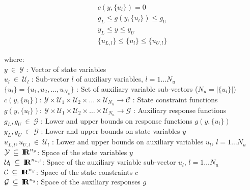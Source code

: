{\bsinglespace
\begin{eqnarray}
& c(y,\{u_l\})  = 0 & \label{tsfcorenonlin:equ:c} \\
& g_L \leq g(y,\{u_l\}) \leq g_U \label{tsfcorenonlin:equ:g} \\
& y_L \leq y \leq y_U \label{tsfcorenonlin:equ:y_bnds} \\
& \{u_{L,l}\} \leq \{u_l\} \leq \{u_{U,l}\} \label{tsfcorenonlin:equ:u_bnds}
\end{eqnarray}
\begin{tabbing}
\hspace{4ex}where:\hspace{5ex}\= \\
\>	$y \:\in\:\mathcal{Y}$ : Vector of state variables \\
\>	$u_l \:\in\:\mathcal{U}_l$ : Sub-vector $l$ of auxiliary variables, $l = 1 \ldots N_u$ \\
\>	$\{u_l\} = \{u_1,u_2,\ldots,u_{N_u}\}$ : Set of auxiliary variable sub-vectors ($N_u = |\{u_l\}|$) \\
\>	$c(y,\{u_l\}) : \:\mathcal{Y} \times \mathcal{U}_1 \times \mathcal{U}_2 \times \ldots \times \mathcal{U}_{N_u}
                 \rightarrow \mathcal{C}$ : State constraint functions \\
\>	$g(y,\{u_l\}) : \:\mathcal{Y} \times \mathcal{U}_1 \times \mathcal{U}_2 \times \ldots \times \mathcal{U}_{N_u}
                 \rightarrow \mathcal{G}$ : Auxiliary response functions \\
\>	$g_L, g_U \:\in\:\mathcal{G}$ : Lower and upper bounds on response functions $g(y,\{u_l\})$ \\
\>	$y_L, y_U \:\in\:\mathcal{G}$ : Lower and upper bounds on state variables $y$ \\
\>	$u_{L,l}, u_{U,l} \:\in\:\mathcal{U}_l$ : Lower and upper bounds on auxiliary variables $u_l$, $l = 1 \ldots N_u$ \\
\>	$\mathcal{Y} \:\subseteq\:\mbox{\textbf{I}}\hspace{-0.6ex}\mbox{\textbf{R}}^{n_y}$: Space of the state variables $y$ \\
\>	$\mathcal{U}_l \:\subseteq\:\mbox{\textbf{I}}\hspace{-0.6ex}\mbox{\textbf{R}}^{n_{u,l}}$: Space of the auxiliary variable sub-vector $u_l$, $l = 1 \ldots N_u$ \\
\>	$\mathcal{C} \:\subseteq\:\mbox{\textbf{I}}\hspace{-0.6ex}\mbox{\textbf{R}}^{n_y}$: Space of the state constraints $c$ \\
\>	$\mathcal{G} \:\subseteq\:\mbox{\textbf{I}}\hspace{-0.6ex}\mbox{\textbf{R}}^{n_g}$: Space of the auxiliary responses $g$
\end{tabbing}
\esinglespace}

